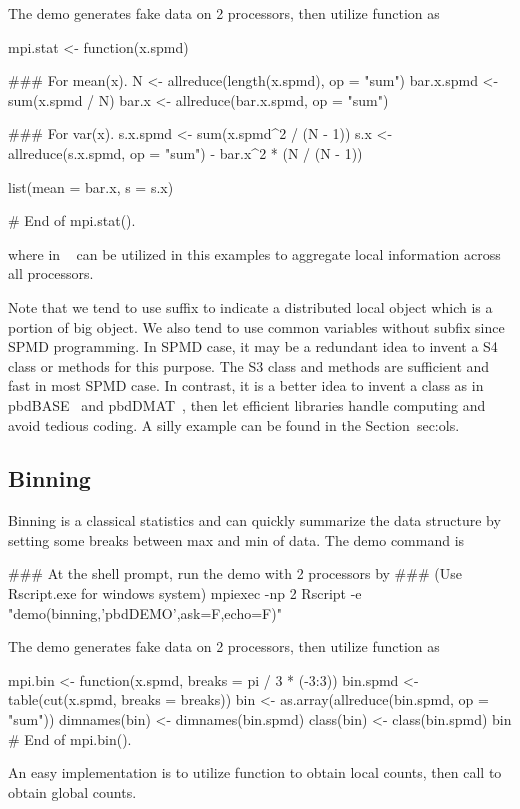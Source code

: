 The demo  generates fake data on 2 processors, then
utilize  function as
\begin{Code}[title=R Code]
mpi.stat <- function(x.spmd){
  ### For mean(x).
  N <- allreduce(length(x.spmd), op = "sum")
  bar.x.spmd <- sum(x.spmd / N)
  bar.x <- allreduce(bar.x.spmd, op = "sum")

  ### For var(x).
  s.x.spmd <- sum(x.spmd^2 / (N - 1))
  s.x <- allreduce(s.x.spmd, op = "sum") - bar.x^2 * (N / (N - 1))

  list(mean = bar.x, s = s.x)
} # End of mpi.stat().
\end{Code}
where  in ~\citep{Chen2012pbdMPIpackage} can
be utilized in this examples to aggregate local information across
all processors.

Note that we tend to use suffix  to indicate a distributed
local object which is a portion of big object.
We also tend to use common variables without subfix 
since SPMD programming.
In SPMD case, it may be a redundant idea to invent a  S4 class
or methods for this purpose. The S3 class and methods are sufficient
and fast in most SPMD case.
In contrast, it is a better idea to invent a  class as in
pbdBASE~\citep{Schmidt2012pbdBASEpackage} and
pbdDMAT~\citep{Schmidt2012pbdDMATpackage}, then let efficient libraries
handle computing and avoid tedious coding.
A silly example can be found in the Section~{sec:ols}.




\subsection[Binning]{Binning}
\label{sec:binning}

Binning is a classical statistics and can quickly summarize
the data structure by setting some breaks between max and min of data.
The demo command is
\begin{Command}
### At the shell prompt, run the demo with 2 processors by
### (Use Rscript.exe for windows system)
mpiexec -np 2 Rscript -e "demo(binning,'pbdDEMO',ask=F,echo=F)"
\end{Command}

The demo  generates fake data on 2 processors, then
utilize  function as
\begin{Code}[title=R Code]
mpi.bin <- function(x.spmd, breaks = pi / 3 * (-3:3)){
  bin.spmd <- table(cut(x.spmd, breaks = breaks))
  bin <- as.array(allreduce(bin.spmd, op = "sum"))
  dimnames(bin) <- dimnames(bin.spmd)
  class(bin) <- class(bin.spmd)
  bin
} # End of mpi.bin().
\end{Code}
An easy implementation is to utilize  function to obtain
local counts, then call  to obtain global counts.



